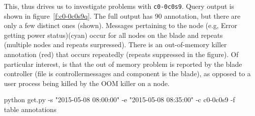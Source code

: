 This, thus drives us to investigate problems with \texttt{c0-0c0s9}. Query output is shown in figure~\ref{f:c0-0c0s9q}. The full output has 90 annotation, but there
are only a few distinct ones (shown). Messages pertaining to the node (e.g, Error getting power status)(cyan) occur for all nodes on the blade and repeats (multiple nodes and repeats
surpressed). There is an out-of-memory killer annotation (red) that occurs repeatedly (repeats suppressed in the figure). Of particular interest, is that the
out of memory problem is reported by the blade controller (file is controllermessages and component is the blade), as opposed to a user process being killed by
the OOM killer on a node.


\begin{figure*}
\begin{annol}
python get.py -s "2015-05-08 08:00:00" -e "2015-05-08 08:35:00" -c c0-0c0s9 -f table annotations


\end{annol}
\end{figure*}
